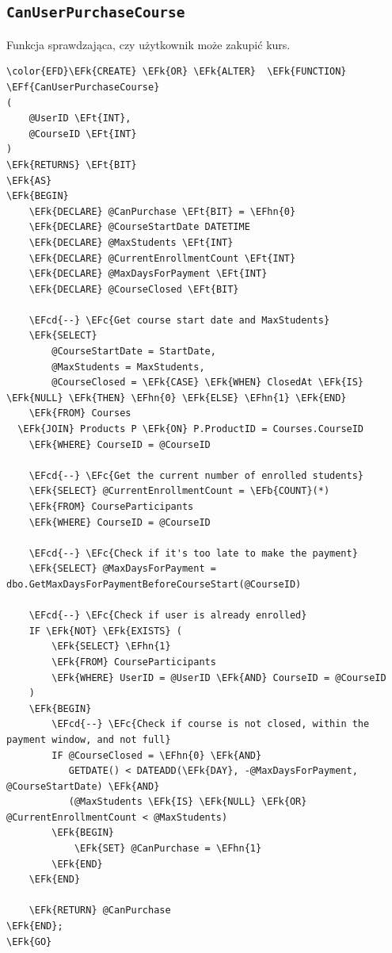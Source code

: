 \documentclass[11pt]{article}
\newcommand{\EFc}[1]{\textcolor{EFc}{\textit{#1}}} %
\newcommand{\EFcd}[1]{\textcolor{EFcd}{\textit{#1}}} %
\newcommand{\EFk}[1]{\textcolor{EFk}{\textbf{#1}}} %
\newcommand{\EFb}[1]{\textcolor{EFb}{\textbf{#1}}} %
\newcommand{\EFf}[1]{\textcolor{EFf}{#1}} %
\newcommand{\EFt}[1]{\textcolor{EFt}{\textbf{#1}}} %
\newcommand{\EFhn}[1]{\textcolor{EFhn}{#1}} %
\begin{document}
\subsection{\texttt{CanUserPurchaseCourse}}
\label{sec:orgd9e00a8}
Funkcja sprawdzająca, czy użytkownik może zakupić kurs.
\begin{Code}
\begin{Verbatim}
\color{EFD}\EFk{CREATE} \EFk{OR} \EFk{ALTER}  \EFk{FUNCTION} \EFf{CanUserPurchaseCourse}
(
    @UserID \EFt{INT},
    @CourseID \EFt{INT}
)
\EFk{RETURNS} \EFt{BIT}
\EFk{AS}
\EFk{BEGIN}
    \EFk{DECLARE} @CanPurchase \EFt{BIT} = \EFhn{0}
    \EFk{DECLARE} @CourseStartDate DATETIME
    \EFk{DECLARE} @MaxStudents \EFt{INT}
    \EFk{DECLARE} @CurrentEnrollmentCount \EFt{INT}
    \EFk{DECLARE} @MaxDaysForPayment \EFt{INT}
    \EFk{DECLARE} @CourseClosed \EFt{BIT}

    \EFcd{--} \EFc{Get course start date and MaxStudents}
    \EFk{SELECT} 
        @CourseStartDate = StartDate, 
        @MaxStudents = MaxStudents,
        @CourseClosed = \EFk{CASE} \EFk{WHEN} ClosedAt \EFk{IS} \EFk{NULL} \EFk{THEN} \EFhn{0} \EFk{ELSE} \EFhn{1} \EFk{END}
    \EFk{FROM} Courses
  \EFk{JOIN} Products P \EFk{ON} P.ProductID = Courses.CourseID
    \EFk{WHERE} CourseID = @CourseID

    \EFcd{--} \EFc{Get the current number of enrolled students}
    \EFk{SELECT} @CurrentEnrollmentCount = \EFb{COUNT}(*)
    \EFk{FROM} CourseParticipants
    \EFk{WHERE} CourseID = @CourseID

    \EFcd{--} \EFc{Check if it's too late to make the payment}
    \EFk{SELECT} @MaxDaysForPayment = dbo.GetMaxDaysForPaymentBeforeCourseStart(@CourseID)

    \EFcd{--} \EFc{Check if user is already enrolled}
    IF \EFk{NOT} \EFk{EXISTS} (
        \EFk{SELECT} \EFhn{1}
        \EFk{FROM} CourseParticipants
        \EFk{WHERE} UserID = @UserID \EFk{AND} CourseID = @CourseID
    )
    \EFk{BEGIN}
        \EFcd{--} \EFc{Check if course is not closed, within the payment window, and not full}
        IF @CourseClosed = \EFhn{0} \EFk{AND} 
           GETDATE() < DATEADD(\EFk{DAY}, -@MaxDaysForPayment, @CourseStartDate) \EFk{AND} 
           (@MaxStudents \EFk{IS} \EFk{NULL} \EFk{OR} @CurrentEnrollmentCount < @MaxStudents)
        \EFk{BEGIN}
            \EFk{SET} @CanPurchase = \EFhn{1}
        \EFk{END}
    \EFk{END}

    \EFk{RETURN} @CanPurchase
\EFk{END};
\EFk{GO}
\end{Verbatim}
\end{Code}
\end{document}
